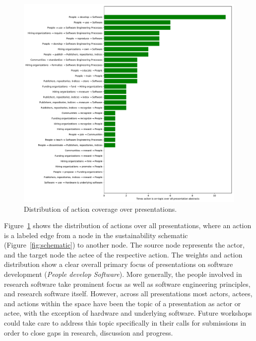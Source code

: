 \documentclass[11pt,letterpaper]{article}
\begin{document}
\begin{figure}[h!]
  \includegraphics[width=\textwidth]{sustainability-actions-plot.pdf}
  \caption{Distribution of action coverage over presentations.}
  \label{fig:actions}
\end{figure}

Figure~\ref{fig:actions} shows the distribution of actions over all presentations, where an action is a labeled edge from a node in the sustainability schematic (Figure~\ref{fig:schematic}) to another node. The source node represents the actor, and the target node the actee of the respective action.
%
The weights and action distribution show a clear overall primary focus of presentations on software development (\textit{People develop Software}). More generally, the people involved in research software take prominent focus as well as software engineering principles, and research software itself. However, across all presentations most actors, actees, and actions within the space have been the topic of a presentation as actor or actee, with the exception of hardware and underlying software. Future workshops could take care to address this topic specifically in their calls for submissions in order to close gaps in research, discussion and progress.

\end{document}
